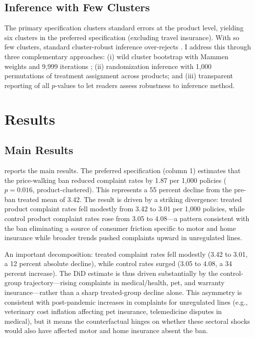 \documentclass[12pt]{article}
\begin{document}
\subsection{Inference with Few Clusters}

The primary specification clusters standard errors at the product level, yielding six clusters in the preferred specification (excluding travel insurance). With so few clusters, standard cluster-robust inference over-rejects \citep{cameron2008bootstrap}. I address this through three complementary approaches: (i) wild cluster bootstrap with Mammen weights and 9,999 iterations \citep{roodman2019fast}; (ii) randomization inference with 1,000 permutations of treatment assignment across products; and (iii) transparent reporting of all $p$-values to let readers assess robustness to inference method.


\section{Results}

\subsection{Main Results}

 reports the main results. The preferred specification (column 1) estimates that the price-walking ban reduced complaint rates by 1.87 per 1,000 policies ($p = 0.016$, product-clustered). This represents a 55 percent decline from the pre-ban treated mean of 3.42. The result is driven by a striking divergence: treated product complaint rates fell modestly from 3.42 to 3.01 per 1,000 policies, while control product complaint rates rose from 3.05 to 4.08---a pattern consistent with the ban eliminating a source of consumer friction specific to motor and home insurance while broader trends pushed complaints upward in unregulated lines.

An important decomposition: treated complaint rates fell modestly (3.42 to 3.01, a 12 percent absolute decline), while control rates surged (3.05 to 4.08, a 34 percent increase). The DiD estimate is thus driven substantially by the control-group trajectory---rising complaints in medical/health, pet, and warranty insurance---rather than a sharp treated-group decline alone. This asymmetry is consistent with post-pandemic increases in complaints for unregulated lines (e.g., veterinary cost inflation affecting pet insurance, telemedicine disputes in medical), but it means the counterfactual hinges on whether these sectoral shocks would also have affected motor and home insurance absent the ban.
\end{document}
